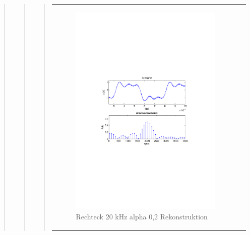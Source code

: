 \begin{quote}
\begin{quote}
\begin{quote}
\begin{center}
\begin{tabular}{ll}
            \hspace{-5cm}
                \begin{minipage}{0.6\textwidth}
                    \begin{figure}[H]
                        \includegraphics[scale=0.55, trim = 16mm 70mm 16mm 85mm, clip]{Bilder/shaperec20_02}
                          \caption{Rechteck 20 kHz alpha 0,2 Rekonstruktion}
		                  \label{fig:shaperec20_02}
                    \end{figure}
                \end{minipage}
                

\end{tabular}
\end{center}
\end{quote}
\end{quote}
\end{quote}
